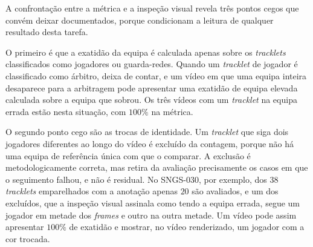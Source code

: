 A confrontação entre a métrica e a inspeção visual revela três pontos cegos que convém deixar
documentados, porque condicionam a leitura de qualquer resultado desta tarefa.

O primeiro é que a exatidão da equipa é calculada apenas sobre os \emph{tracklets} classificados
como jogadores ou guarda-redes. Quando um \emph{tracklet} de jogador é classificado como árbitro,
deixa de contar, e um vídeo em que uma equipa inteira desaparece para a arbitragem pode apresentar
uma exatidão de equipa elevada calculada sobre a equipa que sobrou. Os três vídeos com um
\emph{tracklet} na equipa errada estão nesta situação, com $100\%$ na métrica.

O segundo ponto cego são as trocas de identidade. Um \emph{tracklet} que siga dois jogadores
diferentes ao longo do vídeo é excluído da contagem, porque não há uma equipa de referência única
com que o comparar. A exclusão é metodologicamente correta, mas retira da avaliação precisamente os
casos em que o seguimento falhou, e não é residual. No SNGS-030, por exemplo, dos $38$ \emph{tracklets}
emparelhados com a anotação apenas $20$ são avaliados, e um dos excluídos, que a inspeção visual
assinala como tendo a equipa errada, segue um jogador em metade dos \emph{frames} e outro na outra
metade. Um vídeo pode assim apresentar $100\%$ de exatidão e mostrar, no vídeo renderizado, um
jogador com a cor trocada.

